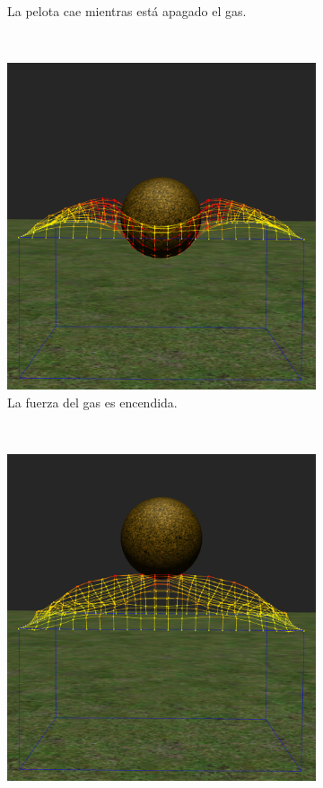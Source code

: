 \begin{figure}
\begin{subfigure}[b]{0.45\textwidth}
    \caption{La pelota cae mientras está apagado el gas.}
    \label{pres:test2}
  \end{subfigure}
\\
  \begin{subfigure}[b]{0.45\textwidth}
    \includegraphics[width=\textwidth]{Img/04/modPress3}
    \caption{La fuerza del gas es encendida.}
    \label{pres:test3}
  \end{subfigure}
~
  \begin{subfigure}[b]{0.45\textwidth}
    \includegraphics[width=\textwidth]{Img/04/modPress4}

\end{subfigure}
\end{figure}
